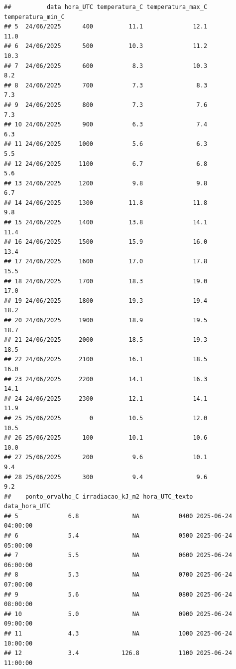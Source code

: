 \documentclass[
]{article}
\begin{document}
\begin{verbatim}
##          data hora_UTC temperatura_C temperatura_max_C temperatura_min_C
## 5  24/06/2025      400          11.1              12.1              11.0
## 6  24/06/2025      500          10.3              11.2              10.3
## 7  24/06/2025      600           8.3              10.3               8.2
## 8  24/06/2025      700           7.3               8.3               7.3
## 9  24/06/2025      800           7.3               7.6               7.3
## 10 24/06/2025      900           6.3               7.4               6.3
## 11 24/06/2025     1000           5.6               6.3               5.5
## 12 24/06/2025     1100           6.7               6.8               5.6
## 13 24/06/2025     1200           9.8               9.8               6.7
## 14 24/06/2025     1300          11.8              11.8               9.8
## 15 24/06/2025     1400          13.8              14.1              11.4
## 16 24/06/2025     1500          15.9              16.0              13.4
## 17 24/06/2025     1600          17.0              17.8              15.5
## 18 24/06/2025     1700          18.3              19.0              17.0
## 19 24/06/2025     1800          19.3              19.4              18.2
## 20 24/06/2025     1900          18.9              19.5              18.7
## 21 24/06/2025     2000          18.5              19.3              18.5
## 22 24/06/2025     2100          16.1              18.5              16.0
## 23 24/06/2025     2200          14.1              16.3              14.1
## 24 24/06/2025     2300          12.1              14.1              11.9
## 25 25/06/2025        0          10.5              12.0              10.5
## 26 25/06/2025      100          10.1              10.6              10.0
## 27 25/06/2025      200           9.6              10.1               9.4
## 28 25/06/2025      300           9.4               9.6               9.2
##    ponto_orvalho_C irradiacao_kJ_m2 hora_UTC_texto       data_hora_UTC
## 5              6.8               NA           0400 2025-06-24 04:00:00
## 6              5.4               NA           0500 2025-06-24 05:00:00
## 7              5.5               NA           0600 2025-06-24 06:00:00
## 8              5.3               NA           0700 2025-06-24 07:00:00
## 9              5.6               NA           0800 2025-06-24 08:00:00
## 10             5.0               NA           0900 2025-06-24 09:00:00
## 11             4.3               NA           1000 2025-06-24 10:00:00
## 12             3.4            126.8           1100 2025-06-24 11:00:00

\end{verbatim}
\end{document}
